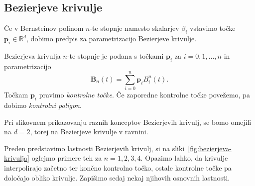 \documentclass[isrm2, tisk]{fmfdelo}
\newcommand{\R}{\mathbb R}
\newcommand{\p}{\textbf{p}}
\newcommand{\lilb}[2]{B_{#1}^{#2}(t)}
\newcommand{\bigbb}[1]{\textbf{B}_{#1}(t)}
\newcommand{\bernsteinsump}[2]{\sum_{#1=0}^{#2} \p_{#1}\lilb{#1}{#2}}
\begin{document}
    \subsection{Bezierjeve krivulje}
    Če v Bernsteinov polinom $n$-te stopnje namesto skalarjev $\beta_i$ vstavimo točke $\p_i\in\R^d$, dobimo predpis za parametrizacijo Bezierjeve krivulje.
    \begin{definicija}
        Bezierjeva krivulja $n$-te stopnje je podana s točkami $\p_i$ za $i=0,1,\ldots,n$ in parametrizacijo
        \[\bigbb{n}=\bernsteinsump{i}{n}.\]
        Točkam $\p_i$ pravimo \textit{kontrolne točke}.
        Če zaporedne kontrolne točke povežemo, pa dobimo \textit{kontrolni poligon}.
    \end{definicija}
    \begin{opomba}
        Pri slikovnem prikazovanju raznih konceptov Bezierjevih krivulj, se bomo omejili na $d=2$, torej na Bezierjeve krivulje v ravnini.
    \end{opomba}
    Preden predstavimo lastnosti Bezierjevih krivulj, si na sliki~\ref{fig:bezierjeva-krivulja} oglejmo primere teh za $n=1,2,3,4$.
    Opazimo lahko, da krivulje interpolirajo začetno ter končno kontrolno točko, ostale kontrolne točke pa določajo obliko krivulje.
    Zapišimo sedaj nekaj njihovih osnovnih lastnosti.
\end{document}
